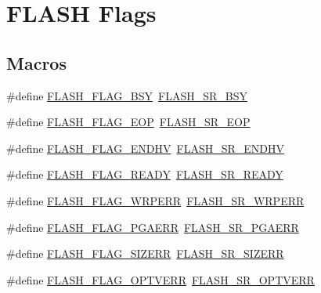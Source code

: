 \hypertarget{group___f_l_a_s_h___flags}{\section{F\-L\-A\-S\-H Flags}
\label{group___f_l_a_s_h___flags}
}
\subsection*{Macros}
\begin{DoxyCompactItemize}
\item 
\#define \hyperlink{group___f_l_a_s_h___flags_gad3bc368f954ad7744deda3315da2fff7}{F\-L\-A\-S\-H\-\_\-\-F\-L\-A\-G\-\_\-\-B\-S\-Y}~\hyperlink{group___peripheral___registers___bits___definition_ga4b86181a96fd2f1cc3828e9d8d83d368}{F\-L\-A\-S\-H\-\_\-\-S\-R\-\_\-\-B\-S\-Y}
\item 
\#define \hyperlink{group___f_l_a_s_h___flags_gaf043ba4d8f837350bfc7754a99fae5a9}{F\-L\-A\-S\-H\-\_\-\-F\-L\-A\-G\-\_\-\-E\-O\-P}~\hyperlink{group___peripheral___registers___bits___definition_gae1301c6b487cfefa247c54a576a0c12b}{F\-L\-A\-S\-H\-\_\-\-S\-R\-\_\-\-E\-O\-P}
\item 
\#define \hyperlink{group___f_l_a_s_h___flags_ga9979b826ad18f10a565f5c0bbab2cd98}{F\-L\-A\-S\-H\-\_\-\-F\-L\-A\-G\-\_\-\-E\-N\-D\-H\-V}~\hyperlink{group___peripheral___registers___bits___definition_gade09361da52e9b32f204c29b9127ccef}{F\-L\-A\-S\-H\-\_\-\-S\-R\-\_\-\-E\-N\-D\-H\-V}
\item 
\#define \hyperlink{group___f_l_a_s_h___flags_gacc11026963ab32982bb4811bd409c06f}{F\-L\-A\-S\-H\-\_\-\-F\-L\-A\-G\-\_\-\-R\-E\-A\-D\-Y}~\hyperlink{group___peripheral___registers___bits___definition_ga3a9a57932b1be3b873c7629d3c2fef4f}{F\-L\-A\-S\-H\-\_\-\-S\-R\-\_\-\-R\-E\-A\-D\-Y}
\item 
\#define \hyperlink{group___f_l_a_s_h___flags_ga6abf64f916992585899369166db3f266}{F\-L\-A\-S\-H\-\_\-\-F\-L\-A\-G\-\_\-\-W\-R\-P\-E\-R\-R}~\hyperlink{group___peripheral___registers___bits___definition_gabf6f52f59b01530928d747cf32bd4d01}{F\-L\-A\-S\-H\-\_\-\-S\-R\-\_\-\-W\-R\-P\-E\-R\-R}
\item 
\#define \hyperlink{group___f_l_a_s_h___flags_ga2c3f4dbea065f8ea2987eada4dab30bd}{F\-L\-A\-S\-H\-\_\-\-F\-L\-A\-G\-\_\-\-P\-G\-A\-E\-R\-R}~\hyperlink{group___peripheral___registers___bits___definition_gac98c2458e114e7f419f3222673878ce0}{F\-L\-A\-S\-H\-\_\-\-S\-R\-\_\-\-P\-G\-A\-E\-R\-R}
\item 
\#define \hyperlink{group___f_l_a_s_h___flags_gac20909664e371d2ca0436a055393f9c4}{F\-L\-A\-S\-H\-\_\-\-F\-L\-A\-G\-\_\-\-S\-I\-Z\-E\-R\-R}~\hyperlink{group___peripheral___registers___bits___definition_ga16d3e511fc0a438812ae9bb44e93e387}{F\-L\-A\-S\-H\-\_\-\-S\-R\-\_\-\-S\-I\-Z\-E\-R\-R}
\item 
\#define \hyperlink{group___f_l_a_s_h___flags_gacb2c4c991a260c3f110cd8c72f302864}{F\-L\-A\-S\-H\-\_\-\-F\-L\-A\-G\-\_\-\-O\-P\-T\-V\-E\-R\-R}~\hyperlink{group___peripheral___registers___bits___definition_ga9c4f055b363ae642d291d73a68eb787d}{F\-L\-A\-S\-H\-\_\-\-S\-R\-\_\-\-O\-P\-T\-V\-E\-R\-R}
\end{DoxyCompactItemize}


